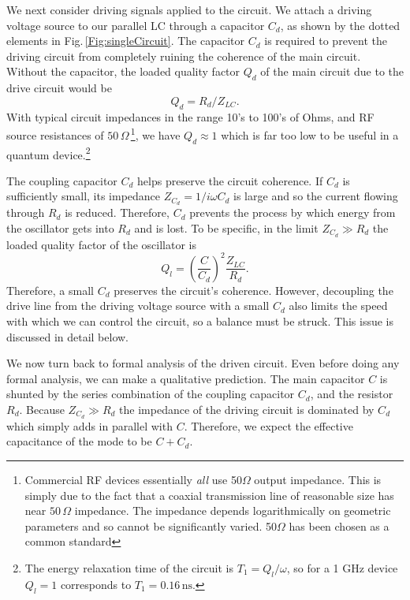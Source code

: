  \label{sec:driving}


We next consider driving signals applied to the circuit.
We attach a driving voltage source to our parallel LC through a capacitor $C_d$, as shown by the dotted elements in Fig.\,\ref{Fig:singleCircuit}.
The capacitor $C_d$ is required to prevent the driving circuit from completely ruining the coherence of the main circuit.
Without the capacitor, the loaded quality factor $Q_d$ of the main circuit due to the drive circuit would be 
\begin{equation}
Q_d = R_d / Z_{LC} .
\end{equation}
With typical circuit impedances in the range 10's to 100's of Ohms, and RF source resistances of $50\,\Omega$\,\footnote{Commercial RF devices essentially \emph{all} use 50$\Omega$ output impedance. This is simply due to the fact that a coaxial transmission line of reasonable size has near $50 \, \Omega$ impedance. The impedance depends logarithmically on geometric parameters and so cannot be significantly varied. 50$\Omega$ has been chosen as a common standard}, we have $Q_d \approx 1$ which is far too low to be useful in a quantum device.\footnote{The energy relaxation time of the circuit is $T_1 = Q_l / \omega$, so for a 1 GHz device $Q_l=1$ corresponds to $T_1=0.16 \, \text{ns}$.}

The coupling capacitor $C_d$ helps preserve the circuit coherence.
If $C_d$ is sufficiently small, its impedance $Z_{C_d} = 1/i\omega C_d$ is large and so the current flowing through $R_d$ is reduced.
Therefore, $C_d$ prevents the process by which energy from the oscillator gets into $R_d$ and is lost.
To be specific, in the limit $Z_{C_d} \gg R_d$ the loaded quality factor of the oscillator is 
\begin{equation}
Q_l = \left( \frac{C}{C_d} \right)^2 \frac{Z_{LC}}{R_d} .
\end{equation}
Therefore, a small $C_d$ preserves the circuit's coherence.
However, decoupling the drive line from the driving voltage source with a small $C_d$ also limits the speed with which we can control the circuit, so a balance must be struck.
This issue is discussed in detail below.

We now turn back to formal analysis of the driven circuit.
Even before doing any formal analysis, we can make a qualitative prediction.
The main capacitor $C$ is shunted by the series combination of the coupling capacitor $C_d$, and the resistor $R_d$.
Because  $Z_{C_d} \gg R_d$ the impedance of the driving circuit is dominated by $C_d$ which simply adds in parallel with $C$.
Therefore, we expect the effective capacitance of the mode to be $C+C_d$.


